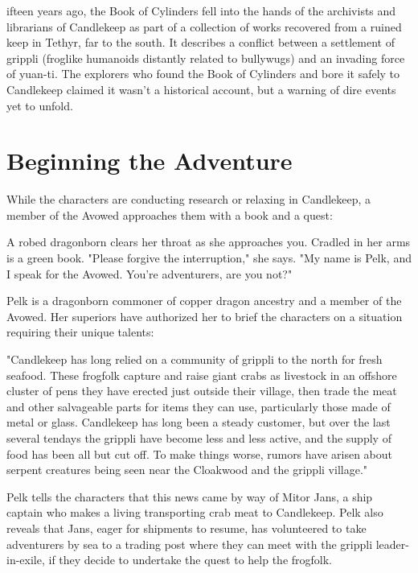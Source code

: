 \documentclass[10pt,a4paper,twoside,bg=print,twocolumn,openany,nodeprecatedcode]{dndbook}
\begin{document}
ifteen years ago, the Book of Cylinders fell into the hands of the archivists and librarians of Candlekeep as part of a collection of works recovered from a ruined keep in Tethyr, far to the south. It describes a conflict between a settlement of grippli (froglike humanoids distantly related to bullywugs) and an invading force of yuan-ti. The explorers who found the Book of Cylinders and bore it safely to Candlekeep claimed it wasn't a historical account, but a warning of dire events yet to unfold.


\section{Beginning the Adventure}
While the characters are conducting research or relaxing in Candlekeep, a member of the Avowed approaches them with a book and a quest:

\begin{DndReadAloud}{}
A robed dragonborn clears her throat as she approaches you. Cradled in her arms is a green book. "Please forgive the interruption," she says. "My name is Pelk, and I speak for the Avowed. You're adventurers, are you not?"

\end{DndReadAloud}

Pelk is a dragonborn commoner of copper dragon ancestry and a member of the Avowed. Her superiors have authorized her to brief the characters on a situation requiring their unique talents:

\begin{DndReadAloud}{}
"Candlekeep has long relied on a community of grippli to the north for fresh seafood. These frogfolk capture and raise giant crabs as livestock in an offshore cluster of pens they have erected just outside their village, then trade the meat and other salvageable parts for items they can use, particularly those made of metal or glass. Candlekeep has long been a steady customer, but over the last several tendays the grippli have become less and less active, and the supply of food has been all but cut off. To make things worse, rumors have arisen about serpent creatures being seen near the Cloakwood and the grippli village."

\end{DndReadAloud}

Pelk tells the characters that this news came by way of Mitor Jans, a ship captain who makes a living transporting crab meat to Candlekeep. Pelk also reveals that Jans, eager for shipments to resume, has volunteered to take adventurers by sea to a trading post where they can meet with the grippli leader-in-exile, if they decide to undertake the quest to help the frogfolk.
\end{document}
